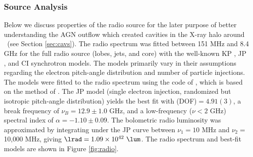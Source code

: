 \documentclass[useAMS,usenatbib]{mn2e}
\begin{document}
\subsubsection{Source Analysis}

Below we discuss properties of the radio source for the later purpose
of better understanding the AGN outflow which created cavities in the
X-ray halo around \irs\ (see Section \ref{sec:cavs}). The radio
spectrum was fitted between 151 MHz and 8.4 GHz for the full radio
source (lobes, jets, and core) with the well-known KP
\citep{1962SvA.....6..317K, pach}, JP \citep{1973A&A....26..423J}, and
CI \citep{1987MNRAS.225..335H} synchrotron models. The models
primarily vary in their assumptions regarding the electron pitch-angle
distribution and number of particle injections. The models were fitted
to the radio spectrum using the code of \citet{2005ApJ...624..656W},
which is based on the method of \citet{1991ApJ...383..554C}. The JP
model (single electron injection, randomized but isotropic pitch-angle
distribution) yields the best fit with \chisq(DOF)$ = 4.91(3)$, a
break frequency of $\nu_B = 12.9 \pm 1.0$ GHz, and a low-frequency
($\nu < 2$ GHz) spectral index of $\alpha = -1.10 \pm 0.09$. The
bolometric radio luminosity was approximated by integrating under the
JP curve between $\nu_1 = 10$ MHz and $\nu_2 =$ 10,000 MHz, giving
$\lrad = 1.09 \times 10^{42}~\lum$. The radio spectrum and best-fit
models are shown in Figure \ref{fig:radio}.
\end{document}
